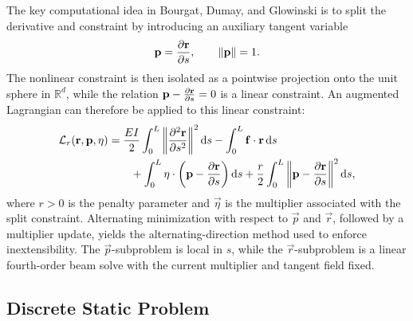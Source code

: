 The key computational idea in Bourgat, Dumay, and Glowinski is to split the
derivative and constraint by introducing an auxiliary tangent variable
\begin{equation}\label{eq:addm-static-split-variable}
    \mathbf{p} = \pdv{\mathbf{r}}{s},
    \qquad
    \left\lVert \mathbf{p} \right\rVert=1.
\end{equation}
The nonlinear constraint is then isolated as a pointwise projection onto the unit
sphere in \(\mathbb{R}^d\), while the relation
\(\mathbf{p}-\pdv{\mathbf{r}}{s}=0\) is a linear constraint. An augmented Lagrangian can
therefore be applied to this linear constraint:
\begin{equation}\label{eq:addm-static-augmented-lagrangian}
    \begin{split}
        \mathcal{L}_r(\vec r,\vec p,\vec \eta)
         & =
        \frac{EI}{2}
        \int_0^L \norm{\pdv[2]{\vec r}{s}}^2 \odif{s}
        -
        \int_0^L \vec f \cdot \vec r \odif{s}
        \\                                     & \qquad +
                                              \int_0^L \vec \eta \cdot
                                              \left(\vec p-\pdv{\vec r}{s}\right)\odif{s}
        +
                                              \frac{r}{2}
        \int_0^L
                                              \norm{\vec p-\pdv{\vec r}{s}}^2 \odif{s},
    \end{split}
\end{equation}
where \(r>0\) is the penalty parameter and
\(\vec \eta\) is the multiplier associated with the split constraint. Alternating
minimization with respect to \(\vec p\) and \(\vec r\), followed by a multiplier
update, yields the alternating-direction method used to enforce
inextensibility. The \(\vec p\)-subproblem is local in \(s\), while the
\(\vec r\)-subproblem is a linear fourth-order beam solve with the current
multiplier and tangent field fixed.

\subsection{Discrete Static Problem}

